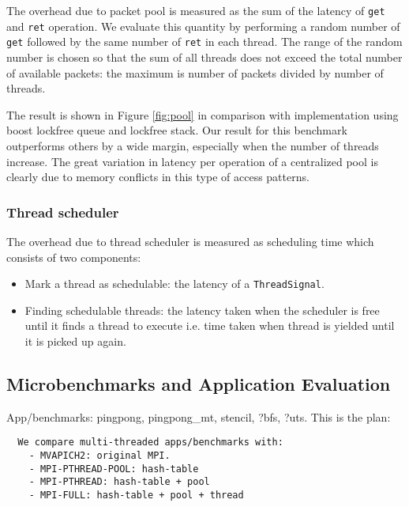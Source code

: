 The overhead due to packet pool is measured as the sum of the latency of
\texttt{get} and \texttt{ret} operation. We evaluate this quantity by performing
a random number of \texttt{get} followed by the same number of \texttt{ret} in
each thread. The range of the random number is chosen so that the sum of all
threads does not exceed the total number of available packets: the maximum is
number of packets divided by number of threads.

The result is shown in Figure \ref{fig:pool} in comparison with implementation
using boost lockfree queue and lockfree stack. Our result for this benchmark
outperforms others by a wide margin, especially when the number of threads
increase. The great variation in latency per operation of a centralized pool is
clearly due to memory conflicts in this type of access patterns.

\subsubsection{Thread scheduler}
The overhead due to thread scheduler is measured as scheduling time which consists
of two components:
\begin{itemize}
    \item Mark a thread as schedulable: the latency of a \texttt{ThreadSignal}.
    \item Finding schedulable threads: the latency taken when the scheduler is free
      until it finds a thread to execute i.e. time taken when thread is yielded until
      it is picked up again.
\end{itemize}

\subsection{Microbenchmarks and Application Evaluation}
App/benchmarks: pingpong, pingpong_mt, stencil, ?bfs, ?uts.
This is the plan:
  \begin{verbatim}
  We compare multi-threaded apps/benchmarks with:
    - MVAPICH2: original MPI.
    - MPI-PTHREAD-POOL: hash-table
    - MPI-PTHREAD: hash-table + pool
    - MPI-FULL: hash-table + pool + thread
  \end{verbatim}
